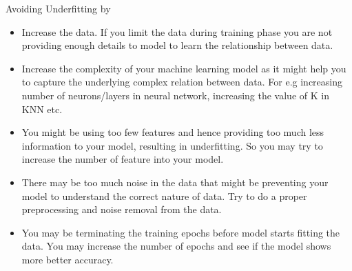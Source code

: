 Avoiding Underfitting by
\begin{itemize}
\item Increase the data. If you limit the data during training phase you are not providing enough details to model to learn the relationship between data.

\item Increase the complexity of your machine learning model as it might help you to capture the underlying complex relation between data. For e.g increasing number of neurons/layers in neural network, increasing the value of K in KNN etc.

\item You might be using too few features and hence providing too much less information to your model, resulting in underfitting. So you may try to increase the number of feature into your model.

\item  There may be too much noise in the data that might be preventing your model to understand the correct nature of data. Try to do a proper preprocessing and noise removal from the data.

\item  You may be terminating the training epochs before model starts fitting the data. You may increase the number of epochs and see if the model shows more better accuracy.
\end{itemize}


